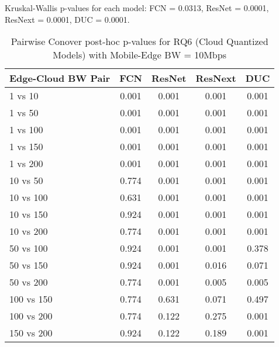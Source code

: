 \begin{table}[h]
\centering
\caption{Pairwise Conover post-hoc p-values for RQ6 (Cloud Quantized Models) with Mobile-Edge BW = 10Mbps}
\label{tab:conover_cloud_quantized_me10}
\smallskip
Kruskal-Wallis p-values for each model: FCN = 0.0313, ResNet = 0.0001, ResNext = 0.0001, DUC = 0.0001.

\begin{tabular}{lcccc}
\toprule
Edge-Cloud BW Pair & FCN & ResNet & ResNext & DUC \\
\midrule
1 vs 10 & 0.001 & 0.001 & 0.001 & 0.001 \\
1 vs 50 & 0.001 & 0.001 & 0.001 & 0.001 \\
1 vs 100 & 0.001 & 0.001 & 0.001 & 0.001 \\
1 vs 150 & 0.001 & 0.001 & 0.001 & 0.001 \\
1 vs 200 & 0.001 & 0.001 & 0.001 & 0.001 \\
10 vs 50 & 0.774 & 0.001 & 0.001 & 0.001 \\
10 vs 100 & 0.631 & 0.001 & 0.001 & 0.001 \\
10 vs 150 & 0.924 & 0.001 & 0.001 & 0.001 \\
10 vs 200 & 0.774 & 0.001 & 0.001 & 0.001 \\
50 vs 100 & 0.924 & 0.001 & 0.001 & 0.378 \\
50 vs 150 & 0.924 & 0.001 & 0.016 & 0.071 \\
50 vs 200 & 0.774 & 0.001 & 0.005 & 0.005 \\
100 vs 150 & 0.774 & 0.631 & 0.071 & 0.497 \\
100 vs 200 & 0.774 & 0.122 & 0.275 & 0.001 \\
150 vs 200 & 0.924 & 0.122 & 0.189 & 0.001 \\
\bottomrule
\end{tabular}
\end{table}


